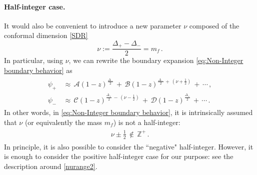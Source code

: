 \documentclass[11pt,a4paper]{article}
\begin{document}
\paragraph{Half-integer case.}
It would also be convenient to introduce a new parameter $\nu$ composed of the conformal dimension \eqref{SDR}
\begin{equation}\label{nudef}
  \nu := \frac{\Delta_+ - \Delta_-}{2} = m_f  \,.
\end{equation}
In particular, using $\nu$, we can rewrite the boundary expansion \eqref{eq:Non-Integer boundary behavior} as 
\begin{align}\label{BCRE22}
\begin{split}
    \psi_+ &\,\approx\, \mathcal{A} (1-z)^{\frac{\Delta_{-}}{2}} \,+\, \mathcal{B} (1-z)^{\frac{\Delta_{-}}{2} \,+\, \left(\nu + \frac{1}{2}\right)}  \,+\, \cdots  \,, \\
%
    \psi_- &\,\approx\, \mathcal{C} (1-z)^{\frac{\Delta_{+}}{2} \,-\, \left(\nu - \frac{1}{2}\right)} \,+\, \mathcal{D} (1-z)^{\frac{\Delta_{+}}{2}} \,+\, \cdots \,.
\end{split}
\end{align}
In other words, in \eqref{eq:Non-Integer boundary behavior}, it is intrinsically assumed
that $\nu$ (or equivalently the mass $m_f$) is not a half-integer:
\begin{align}\label{}
\begin{split}
\nu \pm \frac{1}{2} \,\notin\, \mathbb{Z}^{+}\,.
\end{split}
\end{align}
In principle, it is also possible to consider the ``negative" half-integer. However, it is enough to consider the positive half-integer case for our purpose: see the description around \eqref{nurange2}.
\end{document}
